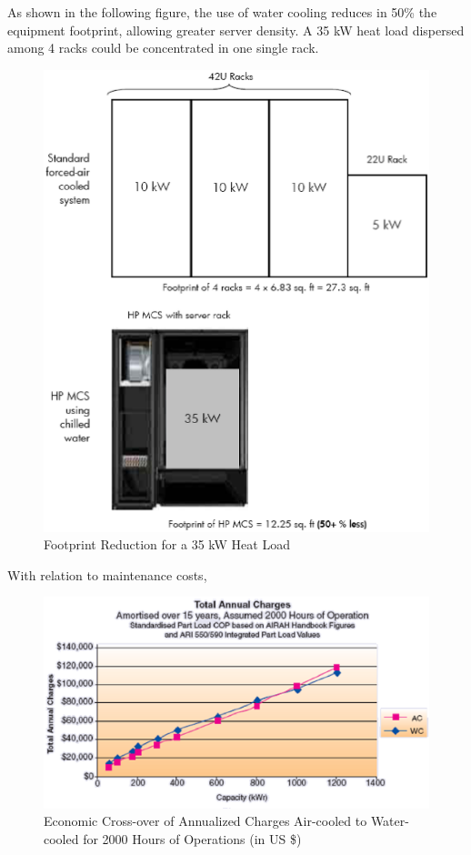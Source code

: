                 As shown in the following figure, the use of water cooling reduces in 50\% the equipment footprint, allowing greater server density. A 35 kW heat load dispersed among 4 racks could be concentrated in one single rack.
                \begin{figure}[h!tb]
                    \centering
                    \includegraphics[scale=0.5]{graphics/footprint_reduction_for_35_heat_load}
                    \caption{Footprint Reduction for a 35 kW Heat Load}
                    \label{fig:footprint_reduction_for_35_heat_load}
                \end{figure}
                With relation to maintenance costs,
                \begin{figure}[h!tb]
                    \centering
                    \includegraphics[scale=0.8]{graphics/economic_crossover_annualized}
                    \caption{Economic Cross-over of Annualized Charges Air-cooled to Water-cooled for 2000 Hours of Operations (in US \$)}
                    \label{fig:economic_crossover_annualized}
                \end{figure}

